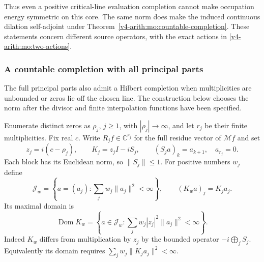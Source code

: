 Thus even a positive critical-line evaluation completion cannot
make occupation energy symmetric on this core. The same norm
does make the induced continuous dilation self-adjoint under
Theorem~\ref{v4-arith:mo:countable-completion}. These statements concern different
source operators, with the exact actions in \eqref{v4-arith:mo:two-actions}.

\subsubsection{A countable completion with all principal parts}

The full principal parts also admit a Hilbert completion when
multiplicities are unbounded or zeros lie off the chosen line.
The construction below chooses the norm after the divisor and
finite interpolation functions have been specified.

Enumerate distinct zeros as $\rho_j$, $j\geq1$, with
$|\rho_j|\to\infty$, and let $r_j$ be their finite multiplicities.
Fix real $c$. Write $R_jf\in\mathbb C^{r_j}$ for the full residue
vector of $\mathcal Mf$ and set
\[
 z_j=i(c-\rho_j),\qquad K_j=z_jI-iS_j,
 \qquad (S_ja)_k=a_{k+1},\quad a_{r_j}=0.
\]
Each block has its Euclidean norm, so $\|S_j\|\leq1$.
For positive numbers $w_j$ define
\[
 \mathscr J_w=\left\{a=(a_j):
              \sum_jw_j\|a_j\|^2<\infty\right\},\qquad
 (K_wa)_j=K_ja_j.
\]
Its maximal domain is
\begin{equation}
 \operatorname{Dom}K_w=
 \left\{a\in\mathscr J_w:
             \sum_jw_j|z_j|^2\|a_j\|^2<\infty\right\}.
 \label{v4-arith:mo:full-domain}
\end{equation}
Indeed $K_w$ differs from multiplication by $z_j$ by the bounded
operator $-i\bigoplus_jS_j$. Equivalently its domain requires
$\sum_jw_j\|K_ja_j\|^2<\infty$.

